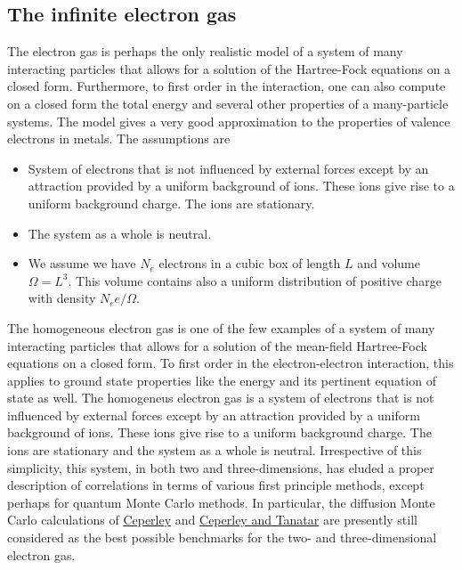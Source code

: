 \documentclass[%
oneside,                 %
final,                   %
10pt]{article}
\begin{document}
\noindent
\subsection{The infinite electron gas}

The electron gas is perhaps the only realistic model of a 
system of many interacting particles that allows for a solution
of the Hartree-Fock equations on a closed form. Furthermore, to first order in the interaction, one can also
compute on a closed form the total energy and several other properties of a many-particle systems. 
The model gives a very good approximation to the properties of valence electrons in metals.
The assumptions are

\begin{itemize}
 \item System of electrons that is not influenced by external forces except by an attraction provided by a uniform background of ions. These ions give rise to a uniform background charge. The ions are stationary.

 \item The system as a whole is neutral.

 \item We assume we have $N_e$ electrons in a cubic box of length $L$ and volume $\Omega=L^3$. This volume contains also a uniform distribution of positive charge with density $N_ee/\Omega$. 
\end{itemize}

\noindent
The homogeneous electron gas is one of the few examples of a system of many
interacting particles that allows for a solution of the mean-field
Hartree-Fock equations on a closed form.  To first order in the
electron-electron interaction, this applies to ground state properties
like the energy and its pertinent equation of state as well.  The
homogeneus electron gas is a system of electrons that is not
influenced by external forces except by an attraction provided by a
uniform background of ions. These ions give rise to a uniform
background charge.  The ions are stationary and the system as a whole
is neutral.
Irrespective of this simplicity, this system, in both two and
three-dimensions, has eluded a proper description of correlations in
terms of various first principle methods, except perhaps for quantum
Monte Carlo methods. In particular, the diffusion Monte Carlo
calculations of \href{{http://journals.aps.org/prl/abstract/10.1103/PhysRevLett.45.566}}{Ceperley} 
and \href{{http://journals.aps.org/prb/abstract/10.1103/PhysRevB.39.5005}}{Ceperley and Tanatar} 
are presently still considered as the
best possible benchmarks for the two- and three-dimensional electron
gas. 
\end{document}
